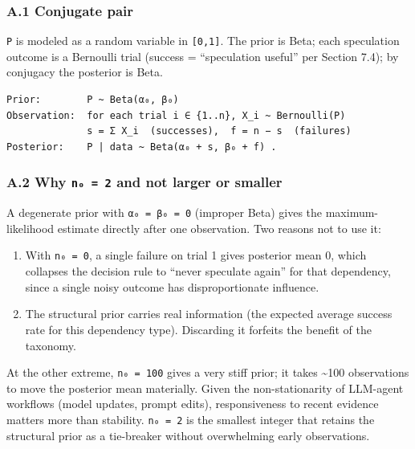 \documentclass[
  11pt,
]{article}
\providecommand{\tightlist}{%
  \setlength{\itemsep}{0pt}\setlength{\parskip}{0pt}}
\begin{document}
\subsubsection{A.1 Conjugate pair}\label{a.1-conjugate-pair}

\texttt{P} is modeled as a random variable in \texttt{{[}0,1{]}}. The
prior is Beta; each speculation outcome is a Bernoulli trial (success =
``speculation useful'' per Section 7.4); by conjugacy the posterior is
Beta.

\begin{verbatim}
Prior:        P ~ Beta(α₀, β₀)
Observation:  for each trial i ∈ {1..n}, X_i ~ Bernoulli(P)
              s = Σ X_i  (successes),  f = n − s  (failures)
Posterior:    P | data ~ Beta(α₀ + s, β₀ + f) .
\end{verbatim}

\subsubsection{\texorpdfstring{A.2 Why \texttt{n₀\ =\ 2} and not larger
or
smaller}{A.2 Why n₀ = 2 and not larger or smaller}}\label{a.2-why-nux2080-2-and-not-larger-or-smaller}

A degenerate prior with \texttt{α₀\ =\ β₀\ =\ 0} (improper Beta) gives
the maximum-likelihood estimate directly after one observation. Two
reasons not to use it:

\begin{enumerate}
\def\labelenumi{\arabic{enumi}.}
\tightlist
\item
  With \texttt{n₀\ =\ 0}, a single failure on trial 1 gives posterior
  mean 0, which collapses the decision rule to ``never speculate again''
  for that dependency, since a single noisy outcome has disproportionate
  influence.
\item
  The structural prior carries real information (the expected average
  success rate for this dependency type). Discarding it forfeits the
  benefit of the taxonomy.
\end{enumerate}

At the other extreme, \texttt{n₀\ =\ 100} gives a very stiff prior; it
takes \textasciitilde100 observations to move the posterior mean
materially. Given the non-stationarity of LLM-agent workflows (model
updates, prompt edits), responsiveness to recent evidence matters more
than stability. \texttt{n₀\ =\ 2} is the smallest integer that retains
the structural prior as a tie-breaker without overwhelming early
observations.
\end{document}
